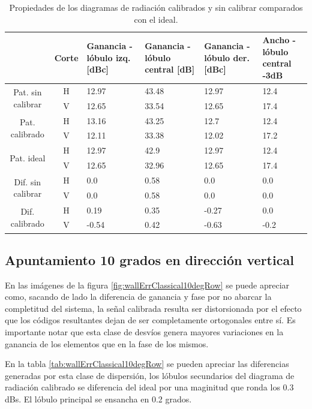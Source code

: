 \begin{table}[H]
  \footnotesize
  \centering
  \begin{tabular}{|c|c|p{2cm}|p{2.5cm}|p{2.5cm}|p{2.5cm}|}
    \cline{2-6}
    \multicolumn{1}{c|}{} & Corte & Ganancia - lóbulo izq. [dBc] & Ganancia - lóbulo central [dB] &
    Ganancia - lóbulo der. [dBc] & Ancho - lóbulo central -3dB \tabularnewline\hline
    \multirow{2}{2cm}{Pat. sin calibrar} & H & 12.97 & 43.48 & 12.97 & 12.4 \tabularnewline\cline{2-6}
     & V & 12.65 & 33.54 & 12.65 & 17.4 \tabularnewline\hline
    \multirow{2}{2cm}{Pat. calibrado} & H & 13.16 & 43.25 & 12.7 & 12.4 \tabularnewline\cline{2-6}
     & V & 12.11 & 33.38 & 12.02 & 17.2 \tabularnewline\hline
    \multirow{2}{2cm}{Pat. ideal} & H & 12.97 & 42.9 & 12.97 & 12.4 \tabularnewline\cline{2-6}
     & V & 12.65 & 32.96 & 12.65 & 17.4 \tabularnewline\hline
    \multirow{2}{2cm}{Dif. sin calibrar} & H & 0.0 & 0.58 & 0.0 & 0.0\tabularnewline\cline{2-6}
     & V & 0.0 & 0.58 & 0.0 & 0.0 \tabularnewline\hline
    \multirow{2}{2cm}{Dif. calibrado} & H & 0.19 & 0.35 & -0.27 & 0.0 \tabularnewline\cline{2-6}
     & V & -0.54 & 0.42 & -0.63 & -0.2 \tabularnewline\hline
  \end{tabular}
  \caption{Propiedades de los diagramas de radiación calibrados y sin calibrar comparados con el ideal.}
  \label{tab:wallErrClassical10degCol}
\end{table}


\subsection{Apuntamiento 10 grados en dirección vertical}

En las imágenes de la figura \ref{fig:wallErrClassical10degRow} se puede apreciar como, sacando de lado la diferencia de ganancia 
y fase por no abarcar la completitud del sistema, la señal calibrada resulta ser distorsionada por el efecto que los códigos 
resultantes dejan de ser completamente ortogonales entre sí. Es importante notar que esta clase de desvíos genera mayores 
variaciones en la ganancia de los elementos que en la fase de los mismos.

En la tabla \ref{tab:wallErrClassical10degRow} se pueden apreciar las diferencias generadas por esta clase de dispersión, los 
lóbulos secundarios del diagrama de radiación calibrado se diferencia del ideal por una maginitud que ronda los 0.3 dBs. El 
lóbulo principal se ensancha en 0.2 grados.

